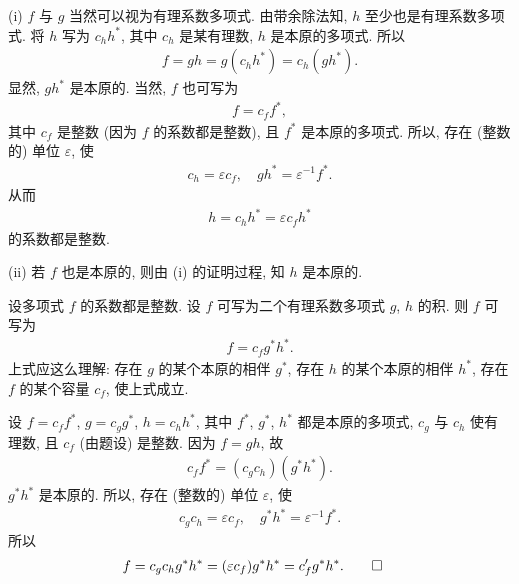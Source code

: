\begin{pf}
    (i) $f$ 与 $g$ 当然可以视为有理系数多项式. 由带余除法知, $h$ 至少也是有理系数多项式. 将 $h$ 写为 $c_h h^{\ast}$, 其中 $c_h$ 是某有理数, $h$ 是本原的多项式. 所以
    \begin{align*}
        f = gh = g(c_h h^{\ast}) = c_h (g h^{\ast}).
    \end{align*}
    显然, $g h^{\ast}$ 是本原的. 当然, $f$ 也可写为
    \begin{align*}
        f = c_f f^{\ast},
    \end{align*}
    其中 $c_f$ 是整数 (因为 $f$ 的系数都是整数), 且 $f^{\ast}$ 是本原的多项式. 所以, 存在 (整数的) 单位 $\varepsilon$, 使
    \begin{align*}
        c_h = \varepsilon c_f, \quad g h^{\ast} = \varepsilon^{-1} f^{\ast}.
    \end{align*}
    从而
    \begin{align*}
        h = c_h h^{\ast} = \varepsilon c_f h^{\ast}
    \end{align*}
    的系数都是整数.

    (ii) 若 $f$ 也是本原的, 则由 (i) 的证明过程, 知 $h$ 是本原的.
\end{pf}

\begin{proposition}
    设多项式 $f$ 的系数都是整数. 设 $f$ 可写为二个有理系数多项式 $g$, $h$ 的积. 则 $f$ 可写为
    \begin{align*}
        f = c_f g^{\ast} h^{\ast}.
    \end{align*}
    上式应这么理解: 存在 $g$ 的某个本原的相伴 $g^{\ast}$, 存在 $h$ 的某个本原的相伴 $h^{\ast}$, 存在 $f$ 的某个容量 $c_f$, 使上式成立.
\end{proposition}

\begin{pf}
    设 $f = c_f f^{\ast}$, $g = c_g g^{\ast}$, $h = c_h h^{\ast}$, 其中 $f^{\ast}$, $g^{\ast}$, $h^{\ast}$ 都是本原的多项式, $c_g$ 与 $c_h$ 使有理数, 且 $c_f$ (由题设) 是整数. 因为 $f = gh$, 故
    \begin{align*}
        c_f f^{\ast} = (c_g c_h) (g^{\ast} h^{\ast}).
    \end{align*}
    $g^{\ast} h^{\ast}$ 是本原的. 所以, 存在 (整数的) 单位 $\varepsilon$, 使
    \begin{align*}
        c_g c_h = \varepsilon c_f, \quad g^{\ast} h^{\ast} = \varepsilon^{-1} f^{\ast}.
    \end{align*}
    所以
    \begin{align*}
         & f = c_g c_h g^{\ast} h^{\ast} = (\varepsilon c_f) g^{\ast} h^{\ast} = c_f^{\prime} g^{\ast} h^{\ast}. \qedhere
    \end{align*}
\end{pf}

